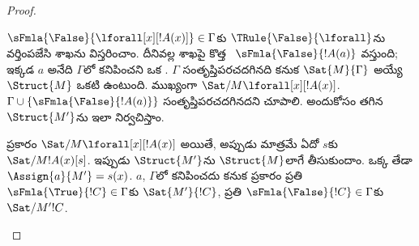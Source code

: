 \documentclass[../../../include/open-logic-section]{subfiles}
\begin{document}
\begin{proof}
\begin{enumerate}
{\item $\sFmla{\False}{\lforall[x][!A(x)]} \in \Gamma$కు
  $\TRule{\False}{\lforall}$ను వర్తింపజేసి శాఖను విస్తరించాం. దీనివల్ల
  శాఖపై కొత్త ~$\sFmla{\False}{!A(a)}$ వస్తుంది;
  ఇక్కడ $a$ అనేది $\Gamma$లో కనిపించని ఒక .
  $\Gamma$ సంతృప్తిపరచదగినది కనుక $\Sat{M}{\Gamma}$ అయ్యే
  $\Struct{M}$ ఒకటి ఉంటుంది. ముఖ్యంగా
  $\Sat/{M}{\lforall[x][!A(x)]}$. $\Gamma \cup
  \{\sFmla{\False}{!A(a)}\}$ సంతృప్తిపరచదగినదని చూపాలి. అందుకోసం
  తగిన~$\Struct{M'}$ను ఇలా నిర్వచిస్తాం.

   ప్రకారం
  $\Sat/{M}{\lforall[x][!A(x)]}$ అయితే, అప్పుడు మాత్రమే ఏదో $s$కు
  $\Sat/{M}{!A(x)}[s]$. ఇప్పుడు $\Struct{M'}$ను $\Struct{M}$లాగే
  తీసుకుందాం. ఒక్క తేడా $\Assign{a}{M'} = s(x)$.
  $a$, $\Gamma$లో కనిపించదు కనుక
   ప్రకారం ప్రతి
  $\sFmla{\True}{!C} \in \Gamma$కు $\Sat{M'}{!C}$, ప్రతి
  $\sFmla{\False}{!C} \in \Gamma$కు $\Sat/{M'}{!C}$.

}
\end{enumerate}
\end{proof}
\end{document}

